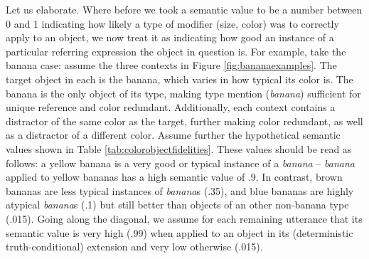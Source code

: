 \documentclass[11pt]{article}
\newcommand{\tableref}[1]{Table \ref{#1}}
\newcommand{\figref}[1]{Figure \ref{#1}}
\begin{document}
Let us elaborate. Where before we took a semantic value to be a number between 0 and 1 indicating how likely a type of modifier (size, color) was to correctly apply to an object, we now treat it as indicating how good an instance of a particular referring expression the object in question is. For example, take the banana case: assume the three contexts in \figref{fig:bananaexamples}. The target object in each is the banana, which varies in how typical its color is. The banana is the only object of its type, making type mention (\emph{banana}) sufficient for unique reference and color redundant. Additionally, each context contains a distractor of the same color as the target, further making color redundant, as well as a distractor of a different color. Assume further the hypothetical semantic values shown in \tableref{tab:colorobjectfidelities}. These values should be read as follows: a yellow banana is a very good or typical instance of a \emph{banana} -- \emph{banana} applied to yellow bananas has a high semantic value of .9. In contrast, brown bananas are less typical instances of \emph{banana}s (.35), and blue bananas are highly atypical \emph{banana}s (.1) but still better than objects of an other non-banana type (.015). Going along the diagonal, we assume for each remaining utterance that its semantic value is very high (.99) when applied to an object in its (deterministic truth-conditional) extension and very low otherwise (.015).
\end{document}
